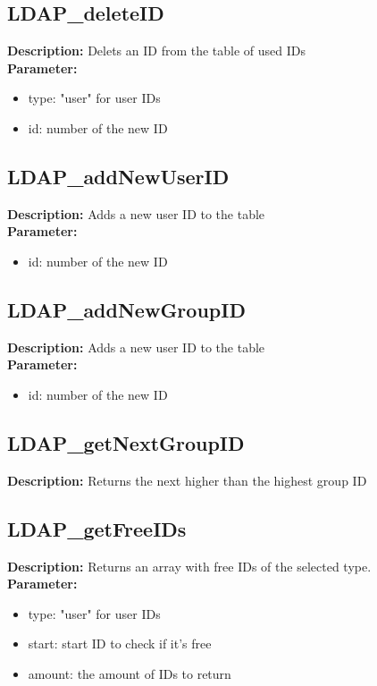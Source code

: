 \subsection{LDAP\_deleteID}
\textbf{Description:} Delets an ID from the table of used IDs\\
\textbf{Parameter:}
\begin{itemize}
\item type: "user" for user IDs
\item id: number of the new ID
\end{itemize}

\subsection{LDAP\_addNewUserID}
\textbf{Description:} Adds a new user ID to the table\\
\textbf{Parameter:}
\begin{itemize}
\item id: number of the new ID
\end{itemize}

\subsection{LDAP\_addNewGroupID}
\textbf{Description:} Adds a new user ID to the table\\
\textbf{Parameter:}
\begin{itemize}
\item id: number of the new ID
\end{itemize}

\subsection{LDAP\_getNextGroupID}
\textbf{Description:} Returns the next higher than the highest group ID\\

\subsection{LDAP\_getFreeIDs}
\textbf{Description:} Returns an array with free IDs of the selected type.\\
\textbf{Parameter:}
\begin{itemize}
\item type: "user" for user IDs
\item start: start ID to check if it's free
\item amount: the amount of IDs to return
\end{itemize}

